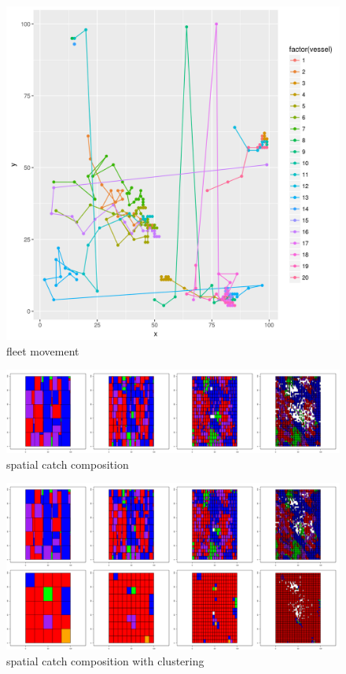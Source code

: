 \documentclass[review]{elsarticle}
\begin{document}
\begin{figure}[!ht]
	\includegraphics[width = \linewidth]{../tests/plots/fleet_moves}
	\caption{fleet movement}
	\label{fig:7}
\end{figure}	

\begin{figure}[!ht]
	\includegraphics[width = \linewidth]{../tests/plots/catch_comp}
	\caption{spatial catch composition}
	\label{fig:8}
\end{figure}	

\begin{figure}[!ht]
	\includegraphics[width = \linewidth]{../tests/plots/catch_comp_clusters}
	\caption{spatial catch composition with clustering}
	\label{fig:9}
\end{figure}	
\end{document}
